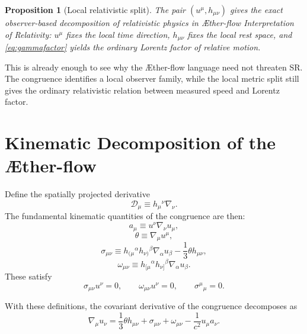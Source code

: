 \documentclass[11pt]{article}
\newcommand{\Aflow}{\AE{}ther-flow}
\newcommand{\TheoryName}{\Aflow{} Interpretation of Relativity}
\newcommand{\Proj}{\mathcal{D}}
\newtheorem{proposition}{Proposition}
\begin{document}
\begin{proposition}[Local relativistic split]
The pair \((u^\mu,h_{\mu\nu})\) gives the exact observer-based decomposition of relativistic physics in \TheoryName{}: \(u^\mu\) fixes the local time direction, \(h_{\mu\nu}\) fixes the local rest space, and \eqref{eq:gammafactor} yields the ordinary Lorentz factor of relative motion.
\end{proposition}

This is already enough to see why the \Aflow{} language need not threaten SR. The congruence identifies a local observer family, while the local metric split still gives the ordinary relativistic relation between measured speed and Lorentz factor.

\section{Kinematic Decomposition of the \Aflow{}}

Define the spatially projected derivative
\begin{equation}
\Proj_\mu \equiv h_\mu{}^\nu \nabla_\nu.
\label{eq:projectedderivative}
\end{equation}
The fundamental kinematic quantities of the congruence are then:
\begin{equation}
a_\mu \equiv u^\nu \nabla_\nu u_\mu,
\label{eq:acceleration}
\end{equation}
\begin{equation}
\theta \equiv \nabla_\mu u^\mu,
\label{eq:expansion}
\end{equation}
\begin{equation}
\sigma_{\mu\nu}
\equiv
h_{(\mu}{}^\alpha h_{\nu)}{}^\beta \nabla_\alpha u_\beta
-\frac{1}{3}\theta h_{\mu\nu},
\label{eq:shear}
\end{equation}
\begin{equation}
\omega_{\mu\nu}
\equiv
h_{[\mu}{}^\alpha h_{\nu]}{}^\beta \nabla_\alpha u_\beta.
\label{eq:vorticity}
\end{equation}
These satisfy
\begin{equation}
\sigma_{\mu\nu}u^\nu = 0,
\qquad
\omega_{\mu\nu}u^\nu = 0,
\qquad
\sigma^\mu{}_\mu = 0.
\label{eq:kinematicprops}
\end{equation}

With these definitions, the covariant derivative of the congruence decomposes as
\begin{equation}
\nabla_\mu u_\nu
=
\frac{1}{3}\theta h_{\mu\nu}
+
\sigma_{\mu\nu}
+
\omega_{\mu\nu}
-\frac{1}{c^2}u_\mu a_\nu.
\label{eq:flowdecomp}
\end{equation}
\end{document}
